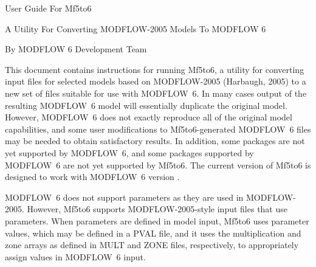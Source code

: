 \documentclass[11pt,twoside,twocolumn]{usgsreport}
\renewcommand{\reporttitle}
{User Guide For \programname{}}
\renewcommand{\theauthors}{MODFLOW 6 Development Team}
\newcommand{\programname}{Mf5to6}
\newcommand{\mfname}{MODFLOW~6}
\newcommand{\reportdate}{\today}
\begin{document}

\ifdef{\makefrontcoveralt}
{
\makefrontcoveralt
\makefrontmatterabv
}
{
\vspace*{\fill}
\begin{center}
{\Large
\reporttitle

A Utility For Converting MODFLOW-2005 Models To MODFLOW 6

\vspace{5mm}
\reportversion

\vspace{5mm}

\large

\vspace{10mm}
\large
By \theauthors
}
\vspace{40mm}
\vspace*{\fill}
\end{center}

\newpage



\maketoc
}

\onecolumn
\pagestyle{body}
\RaggedRight
{}
\pagestyle{body}
\setlength{\parindent}{1.5pc}


%
This document contains instructions for running \programname{}, a utility for converting input files for selected models based on MODFLOW-2005 (Harbaugh, 2005) to a new set of files suitable for use with \mfname{}. In many cases output of the resulting \mfname{} model will essentially duplicate the original model. However, \mfname{} does not exactly reproduce all of the original model capabilities, and some user modifications to \programname{}-generated \mfname{} files may be needed to obtain satisfactory results. In addition, some packages are not yet supported by \mfname{}, and some packages supported by \mfname{} are not yet supported by \programname{}. The current version of \programname{} is designed to work with \mfname{} version \modflowversion{}. 

\mfname{} does not support parameters as they are used in MODFLOW-2005. However, \programname{} supports MODFLOW-2005-style input files that use parameters. When parameters are defined in model input, \programname{} uses parameter values, which may be defined in a PVAL file, and it uses the multiplication and zone arrays as defined in MULT and ZONE files, respectively, to appropriately assign values in \mfname{} input.
\end{document}
